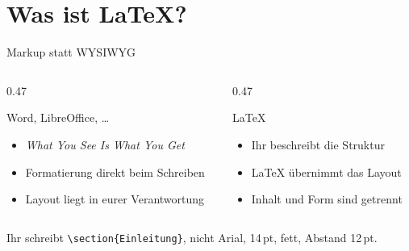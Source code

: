 \section{Was ist \LaTeX?}

\begin{frame}{Markup statt WYSIWYG}
  \begin{columns}[T]
    \begin{column}{0.47\textwidth}
      \begin{kasten}{Word, LibreOffice, \dots}
        \begin{itemize}
          \item \emph{What You See Is What You Get}
          \item Formatierung direkt beim Schreiben
          \item Layout liegt in eurer Verantwortung
        \end{itemize}
      \end{kasten}
    \end{column}
    \begin{column}{0.47\textwidth}
      \begin{kasten}{\LaTeX}
        \begin{itemize}
          \item Ihr beschreibt die \alert{Struktur}
          \item \LaTeX{} übernimmt das \alert{Layout}
          \item Inhalt und Form sind getrennt
        \end{itemize}
      \end{kasten}
    \end{column}
  \end{columns}
  \vspace{0.6em}
  \begin{merke}
    Ihr schreibt \texttt{\textbackslash section\{Einleitung\}}, nicht
    \glqq Arial, 14\,pt, fett, Abstand 12\,pt\grqq.
  \end{merke}
\end{frame}

